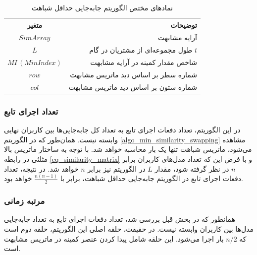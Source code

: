 \begin{table}[h]
	\centering
	\caption{نمادهای مختص الگوریتم جابه‌جایی حداقل شباهت}
	\label{tabel_MinSimilaritySwapNotations}
	\begin{tabular}{cr}
		\hline
		متغیر & توضیحات \\
		\hline
		$SimArray$ & آرایه مشابهت \\
		$L$ & طول مجموعه‌ای از مشتریان در گام $t$ \\
		$MI \, (MinIndex)$ & شاخص مقدار کمینه در آرایه مشابهت \\
		$row$ & شماره سطر بر اساس دید ماتریس مشابهت \\
		$col$ & شماره ستون بر اساس دید ماتریس مشابهت
	\end{tabular}
\end{table}





\vspace{3mm}
\subsubsection{
	تعداد اجرای تابع
}\vspace{-1mm}
در این الگوریتم، تعداد دفعات اجرای تابع
به تعداد کل جابه‌جایی‌ها بین کاربران نهایی وابسته نیست. همان‌طور که در الگوریتم
\ref{algo_min_similarity_swapping}
مشاهده می‌شود، ماتریس شباهت تنها یک بار محاسبه خواهد شد. با توجه به ساختار ماتریس بالا مثلثی در رابطه
\ref{eq_similarity_matrix}
و با فرض این که تعداد مدل‌های کاربران برابر \(n\) در نظر گرفته شود، مقدار \(L\) در الگوریتم نیز برابر \(n\) خواهد شد. در نتیجه، تعداد دفعات اجرای تابع
در الگوریتم جابه‌جایی حداقل شباهت، برابر با \(\frac{n(n-1)}{2}\) خواهد بود.

\vspace{3mm}
\subsubsection{مرتبه زمانی}\vspace{-1mm}
همانطور که در بخش قبل بررسی شد، تعداد دفعات اجرای تابع
به تعداد جابه‌جایی‌ مدل‌ها بین کاربران وابسته نیست. در حقیقت، حلقه اصلی این الگوریتم، حلقه دوم است که \(n/2\) بار اجرا می‌شود. این حلقه شامل پیدا کردن عنصر کمینه در ماتریس مشابهت است. 

